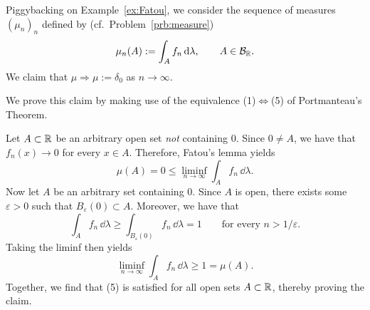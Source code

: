 \begin{example}
	Piggybacking on Example~\ref{ex:Fatou}, we consider the sequence of measures $(\mu_n)_n$ defined by (cf.\ Problem~\ref{prb:measure})
	\[
		\mu_n(A):= \int_A f_n\,\mathrm{d}\lambda,\qquad A\in\mathcal B_{\mathbb R}.
	\]
	We claim that $\mu\Rightarrow \mu:=\delta_0$ as $n\to\infty$.
	
	\smallskip
	\noindent We prove this claim by making use of the equivalence (1)$\Leftrightarrow$(5) of Portmanteau's Theorem.
	
	\smallskip
	\noindent Let $A\subset\mathbb R$ be an arbitrary open set \emph{not} containing $0$. Since $0\ne A$, we have that $f_n(x)\to 0$ for every $x\in A$. Therefore, Fatou's lemma yields
	\[
		\mu(A) = 0 \le \liminf_{n\to\infty} \int_A f_n\,\dd\lambda. 
	\]
	Now let $A$ be an arbitrary set containing $0$. Since $A$ is open, there exists some $\varepsilon>0$ such that $B_\varepsilon(0)\subset A$. Moreover, we have that 
	\[
		\int_A f_n\,\dd\lambda \ge \int_{B_\varepsilon(0)} f_n\,\dd\lambda = 1\qquad\text{for every $n>1/\varepsilon$}.
	\]
	Taking the liminf then yields
	\[
		\liminf_{n\to\infty} \int_A f_n\,\dd\lambda \ge 1 = \mu(A).
	\]
	Together, we find that (5) is satisfied for all open sets $A\subset\mathbb R$, thereby proving the claim.
\end{example}


